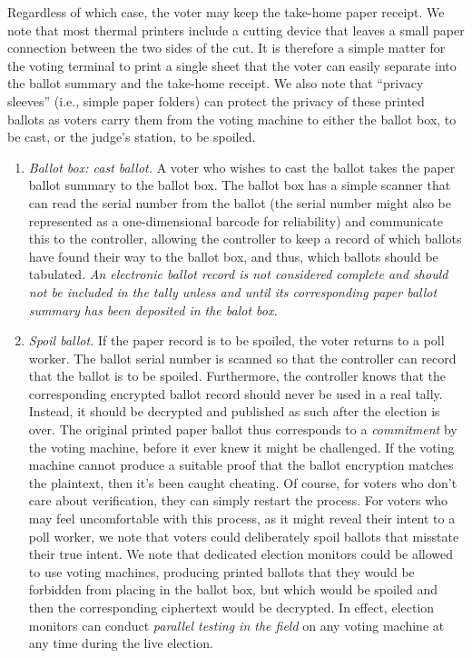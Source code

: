 \begin{enumerate}
 Regardless of which case, the voter may keep the take-home paper receipt.
 We note that most thermal printers include a cutting device that leaves a
 small paper connection between the two sides of the cut.
 It is therefore a simple matter for the voting terminal to print a single
 sheet that the voter can easily separate into the ballot summary and the
 take-home receipt.
 We also note that ``privacy sleeves'' (i.e., simple paper folders) can protect the privacy of these printed ballots as voters carry them from the voting machine to either the ballot box, to be cast, or the judge's station, to be spoiled.

\begin{enumerate}
\item  {\em Ballot box: cast ballot.}
A voter who wishes to cast the ballot takes the paper ballot summary to the ballot box.
The ballot box has a simple scanner that can read the serial number from the ballot
(the serial number might also be represented as a one-dimensional barcode for reliability)
and communicate this to the controller, allowing the controller to keep a record of which ballots have found their way to the ballot box, and thus, which ballots should be tabulated. 
{\em An electronic ballot record is not considered complete and should not be
 included in the tally unless and until its corresponding paper ballot summary has
 been deposited in the balot box.}

\item {\em Spoil ballot.}
If the paper record is to be spoiled, the voter returns to a poll worker.
The ballot serial number is scanned so that the controller can record
that the ballot is to be spoiled. Furthermore, the controller knows that the corresponding encrypted ballot record should never be used in a real tally. 
Instead, it should be decrypted and published as such after the election is over.
The original printed paper ballot thus corresponds to a {\em commitment\/} by the voting machine, before it ever knew it might be challenged.
 If the voting machine cannot produce a suitable proof that the ballot encryption matches the plaintext,
 then it's been caught cheating.
 Of course, for voters who don't care about verification,
 they can simply restart the process.
 For voters who may feel uncomfortable with this process,
 as it might reveal their intent to a poll worker,
 we note that voters could deliberately spoil ballots that misstate their true intent. We note that dedicated election monitors could be allowed to use voting machines, producing printed ballots that they would be forbidden from placing in the ballot box, but which would be spoiled and then the corresponding ciphertext would be decrypted. In effect, election monitors can conduct {\em parallel testing in the field\/} on any voting machine at any time during the live election.



\end{enumerate}
\end{enumerate}
